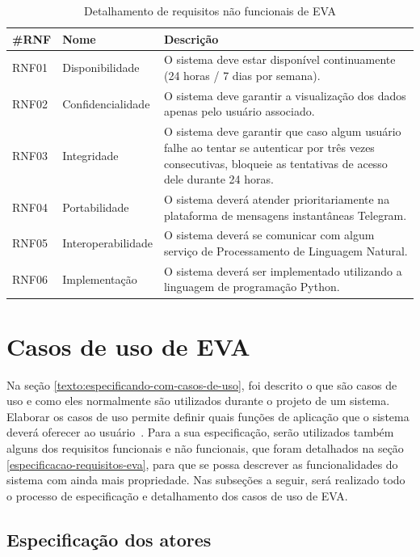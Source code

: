 \begin{table}[htb!]
\caption{Detalhamento de requisitos não funcionais de EVA}
\label{tabela:tabela2}
\center
\footnotesize
\begin{tabular}{|p{1.2cm}|p{3.5cm}|p{7.5cm}|}
  \hline
   \textbf{\#RNF} & \textbf{Nome}  & \textbf{Descrição}  \\
   \hline
    RNF01 & Disponibilidade & O sistema deve estar disponível continuamente (24 horas / 7 dias por semana). \\
   \hline
    RNF02 & Confidencialidade & O sistema deve garantir a visualização dos dados apenas pelo usuário associado. \\
   \hline
    RNF03 & Integridade & O sistema deve garantir que caso algum usuário falhe ao tentar se autenticar por três vezes consecutivas, bloqueie as tentativas de acesso dele durante 24 horas. \\
   \hline
   RNF04 & Portabilidade & O sistema deverá atender prioritariamente na plataforma de mensagens instantâneas Telegram. \\
   \hline
    RNF05 & Interoperabilidade & O sistema deverá se comunicar com algum serviço de Processamento de Linguagem Natural. \\
   \hline
    RNF06 & Implementação & O sistema deverá ser implementado utilizando a linguagem de programação Python. \\
   \hline
   
\end{tabular}
\end{table}\label{tabela:3}

\section{Casos de uso de EVA}

Na seção \ref{texto:especificando-com-casos-de-uso}, foi descrito o que são casos de uso e como eles normalmente são utilizados durante o projeto de um sistema. Elaborar os casos de uso permite definir quais funções de aplicação que o sistema deverá oferecer ao usuário~\cite{ReqJair}. Para a sua especificação, serão utilizados também alguns dos requisitos funcionais e não funcionais, que foram detalhados na seção \ref{especificacao-requisitos-eva}, para que se possa descrever as funcionalidades do sistema com ainda mais propriedade. Nas subseções a seguir, será realizado todo o processo de especificação e detalhamento dos casos de uso de EVA.

\subsection{Especificação dos atores}

